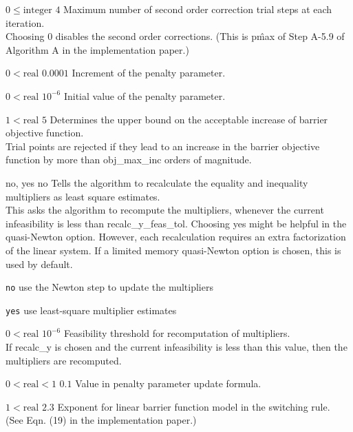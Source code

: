 %
{$0\leq\textrm{integer}$}%
{$4$}%
{Maximum number of second order correction trial steps at each iteration.\\
Choosing 0 disables the second order corrections. (This is p\^{max} of Step A-5.9 of Algorithm A in the implementation paper.)}%
{}

%
{$0<\textrm{real}$}%
{$0.0001$}%
{Increment of the penalty parameter.}%
{}

%
{$0<\textrm{real}$}%
{$10^{- 6}$}%
{Initial value of the penalty parameter.}%
{}

%
{$1<\textrm{real}$}%
{$5$}%
{Determines the upper bound on the acceptable increase of barrier objective function.\\
Trial points are rejected if they lead to an increase in the barrier objective function by more than obj\_max\_inc orders of magnitude.}%
{}

%
{no, yes}%
{no}%
{Tells the algorithm to recalculate the equality and inequality multipliers as least square estimates.\\
This asks the algorithm to recompute the multipliers, whenever the current infeasibility is less than recalc\_y\_feas\_tol. Choosing yes might be helpful in the quasi-Newton option.  However, each recalculation requires an extra factorization of the linear system.  If a limited memory quasi-Newton option is chosen, this is used by default.}%
{\begin{list}{}{
\setlength{\parsep}{0em}
\setlength{\leftmargin}{5ex}
\setlength{\labelwidth}{2ex}
\setlength{\itemindent}{0ex}
\setlength{\topsep}{0pt}}
\item[\texttt{no}] use the Newton step to update the multipliers
\item[\texttt{yes}] use least-square multiplier estimates
\end{list}
}

%
{$0<\textrm{real}$}%
{$10^{- 6}$}%
{Feasibility threshold for recomputation of multipliers.\\
If recalc\_y is chosen and the current infeasibility is less than this value, then the multipliers are recomputed.}%
{}

%
{$0<\textrm{real}<1$}%
{$0.1$}%
{Value in penalty parameter update formula.}%
{}

%
{$1<\textrm{real}$}%
{$2.3$}%
{Exponent for linear barrier function model in the switching rule.\\
(See Eqn. (19) in the implementation paper.)}%
{}

